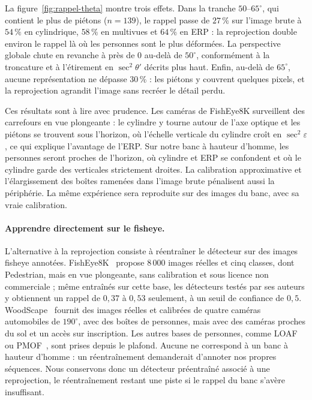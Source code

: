 \documentclass[11pt,a4paper]{article}
\renewcommand{\emph}[1]{\textup{#1}}
\begin{document}
La figure~\ref{fig:rappel-theta} montre trois effets. Dans la tranche $50$--$65^\circ$, qui contient le plus de piétons ($n=139$), le rappel passe de $27\,\%$ sur l'image brute à $54\,\%$ en cylindrique, $58\,\%$ en multivues et $64\,\%$ en ERP : la reprojection double environ le rappel là où les personnes sont le plus déformées. La perspective globale chute en revanche à près de $0$ au-delà de $50^\circ$, conformément à la troncature et à l'étirement en $\sec^2\theta'$ décrits plus haut. Enfin, au-delà de $65^\circ$, aucune représentation ne dépasse $30\,\%$ : les piétons y couvrent quelques pixels, et la reprojection agrandit l'image sans recréer le détail perdu.

Ces résultats sont à lire avec prudence. Les caméras de FishEye8K surveillent des carrefours en vue plongeante : le cylindre y tourne autour de l'axe optique et les piétons se trouvent sous l'horizon, où l'échelle verticale du cylindre croît en $\sec^2\varepsilon$, ce qui explique l'avantage de l'ERP. Sur notre banc à hauteur d'homme, les personnes seront proches de l'horizon, où cylindre et ERP se confondent et où le cylindre garde des verticales strictement droites. La calibration approximative et l'élargissement des boîtes ramenées dans l'image brute pénalisent aussi la périphérie. La même expérience sera reproduite sur des images du banc, avec sa vraie calibration.

\paragraph{Apprendre directement sur le fisheye.} L'alternative à la reprojection consiste à réentraîner le détecteur sur des images fisheye annotées. FishEye8K~\cite{gochoo2023} propose $8\,000$ images réelles et cinq classes, dont \emph{Pedestrian}, mais en vue plongeante, sans calibration et sous licence non commerciale ; même entraînés sur cette base, les détecteurs testés par ses auteurs y obtiennent un rappel de $0{,}37$ à $0{,}53$ seulement, à un seuil de confiance de $0{,}5$. WoodScape~\cite{yogamani2019} fournit des images réelles et calibrées de quatre caméras automobiles de $190^\circ$, avec des boîtes de personnes, mais avec des caméras proches du sol et un accès sur inscription. Les autres bases de personnes, comme LOAF~\cite{yang2023loaf} ou PMOF~\cite{wermuth2026pmof}, sont prises depuis le plafond. Aucune ne correspond à un banc à hauteur d'homme : un réentraînement demanderait d'annoter nos propres séquences. Nous conservons donc un détecteur préentraîné associé à une reprojection, le réentraînement restant une piste si le rappel du banc s'avère insuffisant.
\end{document}
